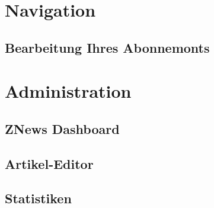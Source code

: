 

\newcommand*{\thetitle}{ZNews\\ Bedienungsanleitung}

\Begin

\section{Navigation}


\subsection{Bearbeitung Ihres Abonnemonts}


\section{Administration}

\subsection{ZNews Dashboard}


\subsection{Artikel-Editor}


\subsection{Statistiken}


\End
